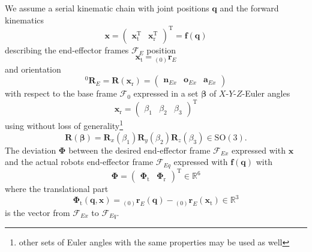 \documentclass[twocolumn,10pt]{IFTOMM}
\newcommand{\bm}[1]{\boldsymbol{#1}}
\newcommand{\ortvek}[4]{{ }_{(#1)}{\boldsymbol{#2}}^{#3}_{#4} }
\newcommand{\vek}[3]{\boldsymbol{#1}^{#2}_{#3}}
\newcommand{\rotmat}[2]{{{ }^{#1}\boldsymbol{R}}_{#2}}
\newcommand{\transp}[0]{{\mathrm{T}}}
\newcommand{\ks}[1]{{\mathcal{F}}_{#1}}
\begin{document}
We assume a serial kinematic chain with joint positions $\bm{q}$ and the forward kinematics
%
\begin{equation}
\bm{x}
=
\begin{pmatrix}
\bm{x}_{\mathrm{t}}^\transp & \bm{x}_{\mathrm{r}}^\transp
\end{pmatrix}^\transp
=
\bm{f} (\bm{q})
\end{equation}  
%
describing the end-effector frames $\ks{E}$ position 
%
\begin{equation}
\bm{x}_{\mathrm{t}}
=
\ortvek{0}{r}{}{E}
\label{equ:xt_def}
\end{equation}  
%
and orientation 
%
\begin{equation}
\rotmat{0}{E}=\bm{R}(\bm{x}_{\mathrm{r}})
=
\begin{pmatrix}\vek{n}{}{Ex} & \vek{o}{}{Ex} & \vek{a}{}{Ex}\end{pmatrix}
\end{equation}  
% 
with respect to the base frame $\ks{0}$ expressed in a set $\bm{\beta}$ of $X$-$Y$-$Z$-Euler angles
%
\begin{equation}
\bm{x}_{\mathrm{r}}
=
\begin{pmatrix}
\beta_1  & \beta_2 & \beta_3
\end{pmatrix}^{\mathrm{T}}
\label{equ:xr_def}
\end{equation} 
%
using without loss of generality\footnote{other sets of Euler angles with the same properties may be used as well}
%
\begin{equation}
\bm{R}(\bm{\beta}) = \bm{R}_x(\beta_1) \bm{R}_y(\beta_2) \bm{R}_z(\beta_3) \in \mathrm{SO(3)}.
\label{equ:def_rmat_xyz}
\end{equation}
%
The deviation $\bm{\Phi}$ between the desired end-effector frame $\ks{Ex}$ expressed with $\bm{x}$ and the actual robots end-effector frame $\ks{Eq}$ expressed with $\bm{f}(\bm{q})$ with 
%
\begin{equation}
\bm{\Phi}=\begin{pmatrix}
\bm{\Phi}_{\mathrm{t}} & \bm{\Phi}_{\mathrm{r}}
\end{pmatrix}^\transp \in {\mathbb{R}}^{6}
\label{equ:Phi_def}
\end{equation}
%
where the translational part 
%
\begin{equation}
\bm{\Phi}_{\mathrm{t}}(\bm{q},\bm{x}) = \ortvek{0}{r}{}{E}(\bm{q}) - \ortvek{0}{r}{}{E}(\bm{x}_{\mathrm{t}}) \in {\mathbb{R}}^{3}
\label{equ:Phit_def}
\end{equation}
%
is the vector from $\ks{Ex}$ to $\ks{Eq}$.
\end{document}
